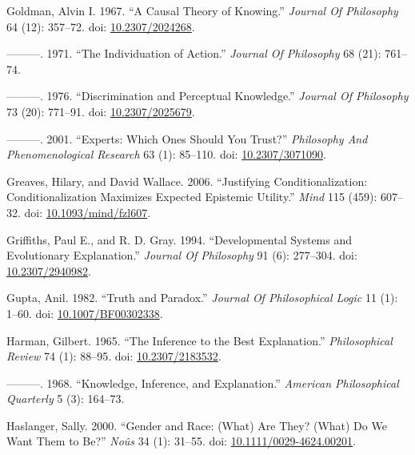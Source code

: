 \documentclass[
  10pt,
  letterpaper,
  DIV=11,
  numbers=noendperiod,
  twoside]{scrartcl}
\newlength{\cslhangindent}
\newenvironment{CSLReferences}[2] %
 {\begin{list}{}{%
  \setlength{\itemindent}{0pt}
  \setlength{\leftmargin}{0pt}
  \setlength{\parsep}{0pt}
  \ifodd #1
   \setlength{\leftmargin}{\cslhangindent}
   \setlength{\itemindent}{-1\cslhangindent}
  \fi
  \setlength{\itemsep}{#2\baselineskip}}}
 {\end{list}}
\begin{document}
\begin{CSLReferences}{1}{0}
Goldman, Alvin I. 1967. {``A Causal Theory of Knowing.''} \emph{Journal
Of Philosophy} 64 (12): 357--72. doi:
\href{https://doi.org/10.2307/2024268}{10.2307/2024268}.

---------. 1971. {``The Individuation of Action.''} \emph{Journal Of
Philosophy} 68 (21): 761--74.

---------. 1976. {``Discrimination and Perceptual Knowledge.''}
\emph{Journal Of Philosophy} 73 (20): 771--91. doi:
\href{https://doi.org/10.2307/2025679}{10.2307/2025679}.

---------. 2001. {``Experts: Which Ones Should You Trust?''}
\emph{Philosophy And Phenomenological Research} 63 (1): 85--110. doi:
\href{https://doi.org/10.2307/3071090}{10.2307/3071090}.

Greaves, Hilary, and David Wallace. 2006. {``Justifying
Conditionalization: Conditionalization Maximizes Expected Epistemic
Utility.''} \emph{Mind} 115 (459): 607--32. doi:
\href{https://doi.org/10.1093/mind/fzl607}{10.1093/mind/fzl607}.

Griffiths, Paul E., and R. D. Gray. 1994. {``Developmental Systems and
Evolutionary Explanation.''} \emph{Journal Of Philosophy} 91 (6):
277--304. doi: \href{https://doi.org/10.2307/2940982}{10.2307/2940982}.

Gupta, Anil. 1982. {``Truth and Paradox.''} \emph{Journal Of
Philosophical Logic} 11 (1): 1--60. doi:
\href{https://doi.org/10.1007/BF00302338}{10.1007/BF00302338}.

Harman, Gilbert. 1965. {``The Inference to the Best Explanation.''}
\emph{Philosophical Review} 74 (1): 88--95. doi:
\href{https://doi.org/10.2307/2183532}{10.2307/2183532}.

---------. 1968. {``Knowledge, Inference, and Explanation.''}
\emph{American Philosophical Quarterly} 5 (3): 164--73.

Haslanger, Sally. 2000. {``Gender and Race: (What) Are They? (What) Do
We Want Them to Be?''} \emph{Noûs} 34 (1): 31--55. doi:
\href{https://doi.org/10.1111/0029-4624.00201}{10.1111/0029-4624.00201}.


\end{CSLReferences}
\end{document}
